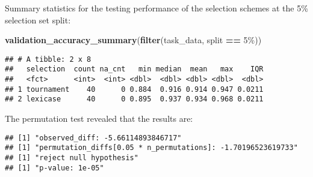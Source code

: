 \documentclass[
]{book}
\newenvironment{Shaded}{\begin{snugshade}}{\end{snugshade}}
\newcommand{\AttributeTok}[1]{\textcolor[rgb]{0.13,0.29,0.53}{#1}}
\newcommand{\DecValTok}[1]{\textcolor[rgb]{0.00,0.00,0.81}{#1}}
\newcommand{\FunctionTok}[1]{\textcolor[rgb]{0.13,0.29,0.53}{\textbf{#1}}}
\newcommand{\NormalTok}[1]{#1}
\newcommand{\OtherTok}[1]{\textcolor[rgb]{0.56,0.35,0.01}{#1}}
\newcommand{\SpecialCharTok}[1]{\textcolor[rgb]{0.81,0.36,0.00}{\textbf{#1}}}
\newcommand{\StringTok}[1]{\textcolor[rgb]{0.31,0.60,0.02}{#1}}
\begin{document}
Summary statistics for the testing performance of the selection schemes at the 5\% selection set split:

\begin{Shaded}
\begin{Highlighting}[]
\FunctionTok{validation\_accuracy\_summary}\NormalTok{(}\FunctionTok{filter}\NormalTok{(task\_data, split }\SpecialCharTok{==} \StringTok{\textquotesingle{}5\%\textquotesingle{}}\NormalTok{))}
\end{Highlighting}
\end{Shaded}

\begin{verbatim}
## # A tibble: 2 x 8
##   selection  count na_cnt   min median  mean   max    IQR
##   <fct>      <int>  <int> <dbl>  <dbl> <dbl> <dbl>  <dbl>
## 1 tournament    40      0 0.884  0.916 0.914 0.947 0.0211
## 2 lexicase      40      0 0.895  0.937 0.934 0.968 0.0211
\end{verbatim}

The permutation test revealed that the results are:

\begin{Shaded}
\end{Shaded}

\begin{verbatim}
## [1] "observed_diff: -5.66114893846717"
## [1] "permutation_diffs[0.05 * n_permutations]: -1.70196523619733"
## [1] "reject null hypothesis"
## [1] "p-value: 1e-05"
\end{verbatim}
\end{document}
